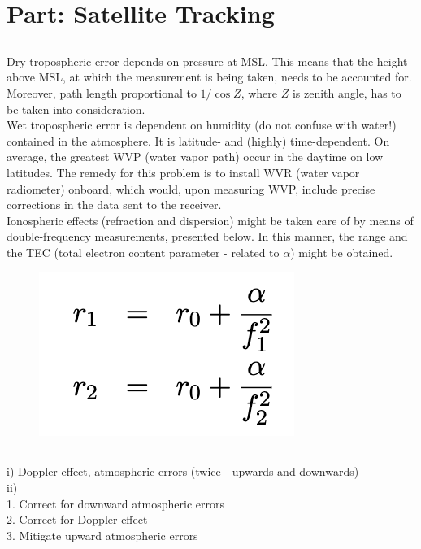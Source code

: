 \section{Part: Satellite Tracking }\label{sec:q2}    

\subsection{}

\indent Dry tropospheric error depends on pressure at MSL. This means that the height above MSL, at which the measurement is being taken, needs to be accounted for. Moreover, path length proportional to $1/\cos Z$, where $Z$ is zenith angle, has to be taken into consideration.\\
\indent Wet tropospheric error is dependent on humidity (do not confuse with water!) contained in the atmosphere. It is latitude- and (highly) time-dependent. On average, the greatest WVP (water vapor path) occur in the daytime on low latitudes. The remedy for this problem is to install WVR (water vapor radiometer) onboard, which would, upon measuring WVP, include precise corrections in the data sent to the receiver. \\
\indent Ionospheric effects (refraction and dispersion) might be taken care of by means of double-frequency measurements, presented below. In this manner, the range and the TEC (total electron content parameter - related to $\alpha$) might be obtained.
\begin{figure}[H]
		\centering
		\includegraphics[width=0.15\linewidth]{eq3.png}
\end{figure}

\subsection{}
i) Doppler effect, atmospheric errors (twice - upwards and downwards)\\
ii) \\1. Correct for downward atmospheric errors \\2. Correct for Doppler effect \\3. Mitigate upward atmospheric errors

